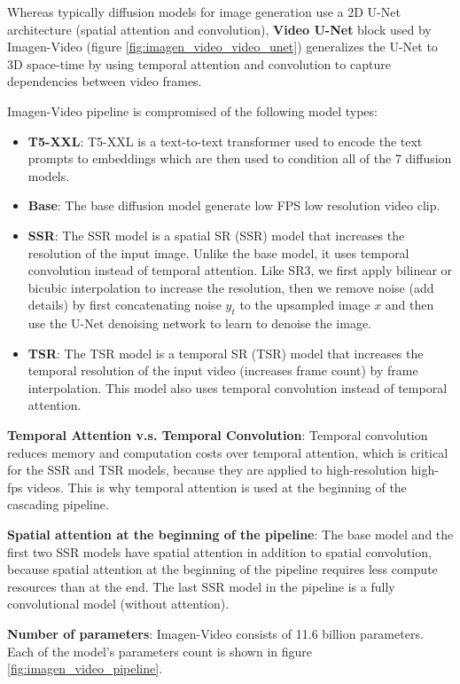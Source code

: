 Whereas typically diffusion models for image generation use a 2D U-Net architecture (spatial attention and convolution), \textbf{Video U-Net} block used by Imagen-Video (figure \ref{fig:imagen_video_video_unet}) generalizes the U-Net to 3D space-time by using temporal attention and convolution to capture dependencies between video frames.

Imagen-Video pipeline is compromised of the following model types:

\begin{itemize}
    \item \textbf{T5-XXL}: T5-XXL is a text-to-text transformer used to encode the text prompts to embeddings which are then used to condition all of the 7 diffusion models.
    \item \textbf{Base}: The base diffusion model generate low FPS low resolution video clip.
    \item \textbf{SSR}: The SSR model is a spatial SR (SSR) model that increases the resolution of the input image. Unlike the base model, it uses temporal convolution instead of temporal attention. Like SR3, we first apply bilinear or bicubic interpolation to increase the resolution, then we remove noise (add details) by first concatenating noise $y_t$ to the upsampled image $x$ and then use the U-Net denoising network to learn to denoise the image.
    \item \textbf{TSR}: The TSR model is a temporal SR (TSR) model that increases the temporal resolution of the input video (increases frame count) by frame interpolation. This model also uses temporal convolution instead of temporal attention.
\end{itemize}

\textbf{Temporal Attention v.s. Temporal Convolution}: Temporal convolution reduces memory and computation costs over temporal attention, which is critical for the SSR and TSR models, because they are applied to high-resolution high-fps videos. This is why temporal attention is used at the beginning of the cascading pipeline.

\textbf{Spatial attention at the beginning of the pipeline}: The base model and the first two SSR models have spatial attention in addition to spatial convolution, because spatial attention at the beginning of the pipeline requires less compute resources than at the end. The last SSR model in the pipeline is a fully convolutional model (without attention).

\textbf{Number of parameters}: Imagen-Video consists of 11.6 billion parameters. Each of the model's parameters count is shown in figure \ref{fig:imagen_video_pipeline}.

